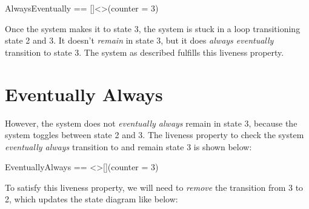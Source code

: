 \begin{tla}
    AlwaysEventually == []<>(counter = 3)
\end{tla}
\begin{tlatex}
\end{tlatex}
\newline

Once the system makes it to state 3, the system is stuck in a loop transitioning
state 2 and 3. It doesn't \textit{remain} in state 3, but it does \textit{always
eventually} transition to state 3. The system as described fulfills this liveness
property.

\section{Eventually Always}

However, the system does not \textit{eventually always} remain in state 3, because
the system toggles between state 2 and 3. The liveness property to check the
system \textit{eventually always} transition to and remain state 3 is shown
below:\\

\begin{tla}
    EventuallyAlways == <>[](counter = 3)
\end{tla}
\begin{tlatex}
\end{tlatex}
\newline

To satisfy this liveness property, we will need to \textit{remove} the
transition from 3 to 2, which updates the state diagram like below:

\begin{center}
\end{center}

